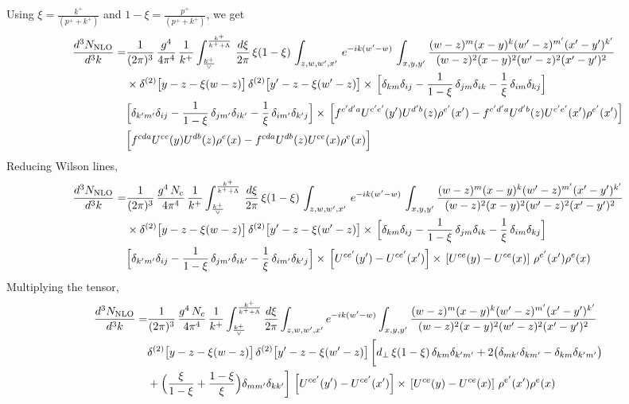 \documentclass[9pt]{article}
\numberwithin{equation}{section}
\begin{document}
Using $\xi = \frac{k^{+}}{(p^{+}+k^{+})}$ and $1-\xi = \frac{p^{+}}{(p^{+}+k^{+})}$, we get
\begin{align}
\frac{d^{3}N_{\rm NLO}}{d^{3}k}= &\frac{1}{(2\pi)^{3}}\,\frac{g^{4}}{4\pi^{4}}\,\frac{1}{k^{+}}\int_{\frac{k^{+}}{\vee}}^{\frac{k^{+}}{k^{+}+\Lambda}}\,\frac{d\xi}{2\pi}\,\xi(1-\xi)\,\int_{z,w,w',x'}\,e^{-ik(w'-w)}\,\int_{x,y,y'}\frac{(w-z)^{m}(x-y)^{k}(w'-z)^{m'}(x'-y')^{k'}}{(w-z)^{2}(x-y)^{2}(w'-z)^{2}(x'-y')^{2}}
\notag \\ & \times\delta^{(2)}\big[y-z-\xi(w-z)\big]\,\delta^{(2)}\big[y'-z-\xi(w'-z)\big]
\times\,\Big[\delta_{km}\delta_{ij}-\frac{1}{1-\xi}\,\delta_{jm}\delta_{ik}-\frac{1}{\xi}\,\delta_{im}\delta_{kj}\Big]\notag \\ & \Big[\delta_{k'm'}\delta_{ij}-\frac{1}{1-\xi}\,\delta_{jm'}\delta_{ik'}-\frac{1}{\xi}\,\delta_{im'}\delta_{k'j}\Big]\times\,\Big[f^{c'd'a}U^{c'e'}(y')U^{d'b}(z)\rho^{e'}(x')-f^{c'd'a}U^{d'b}(z)U^{c'e'}(x')\rho^{e'}(x')\Big]\notag \\ & \Big[f^{cda}U^{ce}(y)U^{db}(z)\rho^{e}(x)-f^{cda}U^{db}(z)U^{ce}(x)\rho^{e}(x)\Big]
\end{align}
Reducing Wilson lines, 
\begin{align}
\frac{d^{3}N_{\rm NLO}}{d^{3}k}= &\frac{1}{(2\pi)^{3}}\,\frac{g^{4}\,N_{c}}{4\pi^{4}}\,\frac{1}{k^{+}}\int_{\frac{k^{+}}{\vee}}^{\frac{k^{+}}{k^{+}+\Lambda}}\,\frac{d\xi}{2\pi}\,\xi(1-\xi)\,\int_{z,w,w',x'}\,e^{-ik(w'-w)}\,\int_{x,y,y'}\frac{(w-z)^{m}(x-y)^{k}(w'-z)^{m'}(x'-y')^{k'}}{(w-z)^{2}(x-y)^{2}(w'-z)^{2}(x'-y')^{2}}
\notag \\ & \times\delta^{(2)}\big[y-z-\xi(w-z)\big]\,\delta^{(2)}\big[y'-z-\xi(w'-z)\big]
\times\,\Big[\delta_{km}\delta_{ij}-\frac{1}{1-\xi}\,\delta_{jm}\delta_{ik}-\frac{1}{\xi}\,\delta_{im}\delta_{kj}\Big]\notag \\ & \Big[\delta_{k'm'}\delta_{ij}-\frac{1}{1-\xi}\,\delta_{jm'}\delta_{ik'}-\frac{1}{\xi}\,\delta_{im'}\delta_{k'j}\Big]\times\,\left[U^{ce'}(y') - U^{ce'}(x')\right] \times\, \left[U^{ce}(y) - U^{ce}(x)\right]\, \rho^{e'}(x') \rho^{e}(x)
\end{align}
Multiplying the tensor,
\begin{align}
\frac{d^{3}N_{\rm NLO}}{d^{3}k}= &\frac{1}{(2\pi)^{3}}\,\frac{g^{4}\,N_{c}}{4\pi^{4}}\,\frac{1}{k^{+}}\int_{\frac{k^{+}}{\vee}}^{\frac{k^{+}}{k^{+}+\Lambda}}\frac{d\xi}{2\pi}\int_{z,w,w',x'}e^{-ik(w'-w)}\int_{x,y,y'}\frac{(w-z)^{m}(x-y)^{k}(w'-z)^{m'}(x'-y')^{k'}}{(w-z)^{2}(x-y)^{2}(w'-z)^{2}(x'-y')^{2}}\notag\\ &\delta^{(2)}\big[y-z-\xi(w-z)\big]\,\delta^{(2)}\big[y'-z-\xi(w'-z)\big]\,\bigg[d_{\perp}\,\xi(1-\xi)\,\delta_{km}\delta_{k'm'}+2\big(\delta_{mk'}\delta_{km'}-\delta_{km}\delta_{k'm'}\big)\notag \\ & +\Big(\frac{\xi}{1-\xi}+\frac{1-\xi}{\xi}\Big)\delta_{mm'}\delta_{kk'}\bigg]\, \left[U^{ce'}(y') - U^{ce'}(x')\right] \times\, \left[U^{ce}(y) - U^{ce}(x)\right]\, \rho^{e'}(x') \rho^{e}(x)
\end{align}
\end{document}
